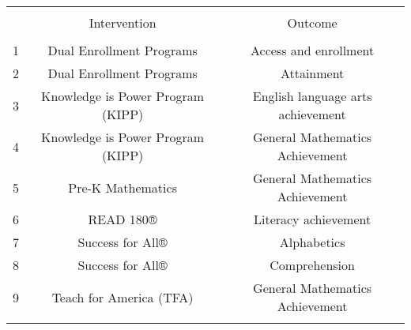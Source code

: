 
\begin{table}[!htbp] \centering 
  \caption{} 
  \label{all_tiers} 
\tiny 
\begin{tabular}{@{\extracolsep{1mm}} ccc} 
\\[-1.8ex]\hline 
\hline \\[-1.8ex] 
 & Intervention & Outcome \\ 
\hline \\[-1.8ex] 
1 & Dual Enrollment Programs & Access and enrollment \\ 
2 & Dual Enrollment Programs & Attainment \\ 
3 & Knowledge is Power Program (KIPP) & English language arts achievement \\ 
4 & Knowledge is Power Program (KIPP) & General Mathematics Achievement \\ 
5 & Pre-K Mathematics & General Mathematics Achievement \\ 
6 & READ 180® & Literacy achievement \\ 
7 & Success for All® & Alphabetics \\ 
8 & Success for All® & Comprehension \\ 
9 & Teach for America (TFA) & General Mathematics Achievement \\ 
\hline \\[-1.8ex] 
\end{tabular} 
\end{table} 
